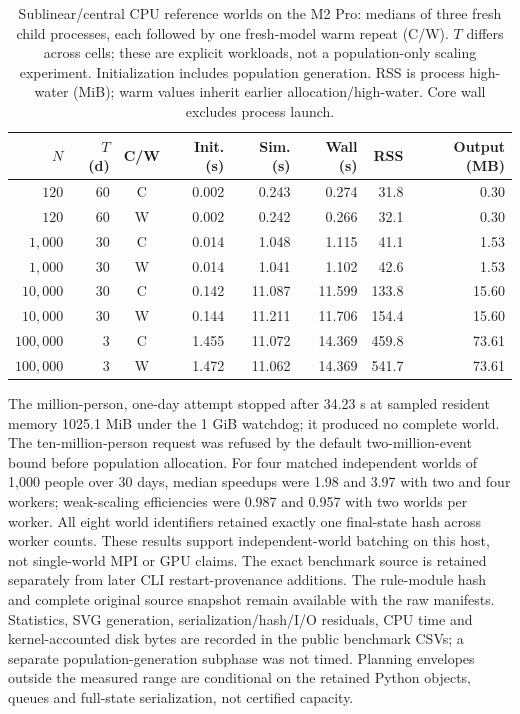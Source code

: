 \begin{table}[tbp]
\centering\small
\caption{Sublinear/central CPU reference worlds on the M2 Pro: medians of three fresh child processes, each followed by one fresh-model warm repeat (C/W). $T$ differs across cells; these are explicit workloads, not a population-only scaling experiment. Initialization includes population generation. RSS is process high-water (MiB); warm values inherit earlier allocation/high-water. Core wall excludes process launch.}
\label{tab:benchmark}
\begin{tabular}{@{}rrcrrrrr@{}}
\toprule $N$ & $T$ (d) & C/W & Init. (s) & Sim. (s) & Wall (s) & RSS & Output (MB) \\ \midrule
$120$ & 60 & C & 0.002 & 0.243 & 0.274 & 31.8 & 0.30 \\
$120$ & 60 & W & 0.002 & 0.242 & 0.266 & 32.1 & 0.30 \\
$1{,}000$ & 30 & C & 0.014 & 1.048 & 1.115 & 41.1 & 1.53 \\
$1{,}000$ & 30 & W & 0.014 & 1.041 & 1.102 & 42.6 & 1.53 \\
$10{,}000$ & 30 & C & 0.142 & 11.087 & 11.599 & 133.8 & 15.60 \\
$10{,}000$ & 30 & W & 0.144 & 11.211 & 11.706 & 154.4 & 15.60 \\
$100{,}000$ & 3 & C & 1.455 & 11.072 & 14.369 & 459.8 & 73.61 \\
$100{,}000$ & 3 & W & 1.472 & 11.062 & 14.369 & 541.7 & 73.61 \\
\bottomrule\end{tabular}
\end{table}
The million-person, one-day attempt stopped after 34.23 s at sampled resident memory 1025.1 MiB under the 1 GiB watchdog; it produced no complete world. The ten-million-person request was refused by the default two-million-event bound before population allocation. For four matched independent worlds of 1,000 people over 30 days, median speedups were 1.98 and 3.97 with two and four workers; weak-scaling efficiencies were 0.987 and 0.957 with two worlds per worker. All eight world identifiers retained exactly one final-state hash across worker counts. These results support independent-world batching on this host, not single-world MPI or GPU claims.
The exact benchmark source is retained separately from later CLI restart-provenance additions. The rule-module hash and complete original source snapshot remain available with the raw manifests. Statistics, SVG generation, serialization/hash/I/O residuals, CPU time and kernel-accounted disk bytes are recorded in the public benchmark CSVs; a separate population-generation subphase was not timed. Planning envelopes outside the measured range are conditional on the retained Python objects, queues and full-state serialization, not certified capacity.
